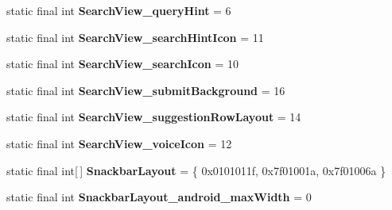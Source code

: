 \begin{DoxyCompactItemize}
\item 
\hypertarget{classandroid_1_1support_1_1design_1_1_r_1_1styleable_acc4b375bea8292a63545198b51a29d5d}{}static final int {\bfseries Search\+View\+\_\+query\+Hint} = 6\label{classandroid_1_1support_1_1design_1_1_r_1_1styleable_acc4b375bea8292a63545198b51a29d5d}

\item 
\hypertarget{classandroid_1_1support_1_1design_1_1_r_1_1styleable_a0827f610b43401bd60d5813fe46f3fb8}{}static final int {\bfseries Search\+View\+\_\+search\+Hint\+Icon} = 11\label{classandroid_1_1support_1_1design_1_1_r_1_1styleable_a0827f610b43401bd60d5813fe46f3fb8}

\item 
\hypertarget{classandroid_1_1support_1_1design_1_1_r_1_1styleable_a497935dee330894c6113c51859a9df04}{}static final int {\bfseries Search\+View\+\_\+search\+Icon} = 10\label{classandroid_1_1support_1_1design_1_1_r_1_1styleable_a497935dee330894c6113c51859a9df04}

\item 
\hypertarget{classandroid_1_1support_1_1design_1_1_r_1_1styleable_a9d993a18b88d403afc9c07acad19a1b1}{}static final int {\bfseries Search\+View\+\_\+submit\+Background} = 16\label{classandroid_1_1support_1_1design_1_1_r_1_1styleable_a9d993a18b88d403afc9c07acad19a1b1}

\item 
\hypertarget{classandroid_1_1support_1_1design_1_1_r_1_1styleable_a3deb2c90b3e5b8644299a3f99b8600b8}{}static final int {\bfseries Search\+View\+\_\+suggestion\+Row\+Layout} = 14\label{classandroid_1_1support_1_1design_1_1_r_1_1styleable_a3deb2c90b3e5b8644299a3f99b8600b8}

\item 
\hypertarget{classandroid_1_1support_1_1design_1_1_r_1_1styleable_ad3cd224bd53a0d7aeb792c6cc96d9c48}{}static final int {\bfseries Search\+View\+\_\+voice\+Icon} = 12\label{classandroid_1_1support_1_1design_1_1_r_1_1styleable_ad3cd224bd53a0d7aeb792c6cc96d9c48}

\item 
\hypertarget{classandroid_1_1support_1_1design_1_1_r_1_1styleable_ade77d86fa8e689770b5436467abdc2db}{}static final int\mbox{[}$\,$\mbox{]} {\bfseries Snackbar\+Layout} = \{ 0x0101011f, 0x7f01001a, 0x7f01006a \}\label{classandroid_1_1support_1_1design_1_1_r_1_1styleable_ade77d86fa8e689770b5436467abdc2db}

\item 
\hypertarget{classandroid_1_1support_1_1design_1_1_r_1_1styleable_ae7cafc8b9ec5f6ae9e5d5465354a0764}{}static final int {\bfseries Snackbar\+Layout\+\_\+android\+\_\+max\+Width} = 0\label{classandroid_1_1support_1_1design_1_1_r_1_1styleable_ae7cafc8b9ec5f6ae9e5d5465354a0764}


\end{DoxyCompactItemize}
